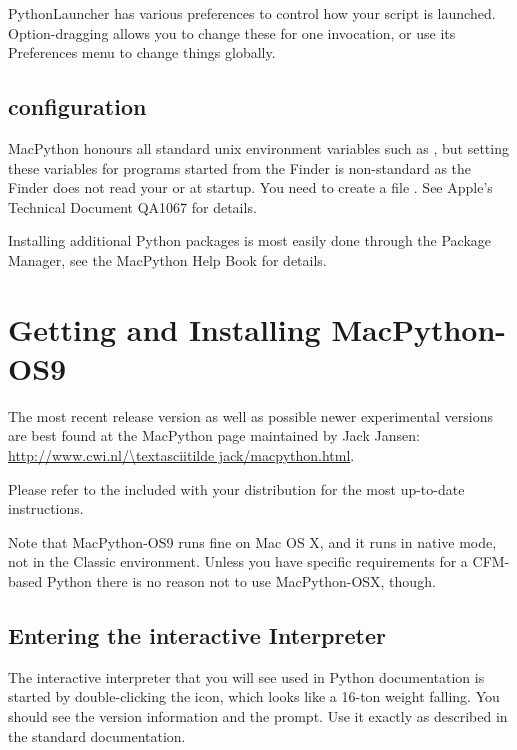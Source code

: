 PythonLauncher has various preferences to control how your script is launched.
Option-dragging allows you to change these for one invocation, or use its
Preferences menu to change things globally.

\subsection{configuration}

MacPython honours all standard unix environment variables such as ,
but setting these variables for programs started from the Finder is non-standard
as the Finder does not read your  or  at startup.
You need to create a file .
See Apple's Technical Document QA1067 for details.

Installing additional Python packages is most easily done through the
Package Manager, see the MacPython Help Book for details.

\section{Getting and Installing MacPython-OS9 \label{getting}}

The most recent release version as well as possible newer experimental
versions are best found at the MacPython page maintained by Jack
Jansen: \url{http://www.cwi.nl/\textasciitilde jack/macpython.html}.

Please refer to the  included with your distribution for
the most up-to-date instructions.

Note that MacPython-OS9 runs fine on Mac OS X, and it runs in native
mode, not in the Classic environment. Unless you have specific
requirements for a CFM-based Python there is no reason not to
use MacPython-OSX, though.


\subsection{Entering the interactive Interpreter
         \label{interpreter}}

The interactive interpreter that you will see used in Python
documentation is started by double-clicking the
 icon, which looks like a 16-ton weight
falling. You should see the version information and the
\samp{>\code{>}>~} prompt.  Use it exactly as described in the
standard documentation.


